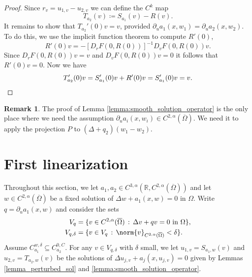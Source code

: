 \documentclass[11pt,a4paper]{amsart}
\theoremstyle{definition}
\newtheorem{Remark}[Theorem]{Remark}
\numberwithin{equation}{section}
\newcommand{\mR}{\mathbb{R}}                    %
\newcommand{\ol}[1]{\overline{#1}}
\newcommand{\p}{\partial}
\newcommand{\Om}{\Omega}
\begin{document}
\begin{proof}
Since $r_v = u_{1,v} - u_{2,v}$ we can define the $C^k$ map
\begin{equation*}
	T_{a_2}(v) \coloneqq S_{a_1}(v) - R(v).
\end{equation*}
It remains to show that $T_{a_2}'(0)v = v$, provided \( \partial_{u}a_{1}(x,w_{1}) = \partial_{u}a_{2}(x,w_{2}) \).
To do this, we use the implicit function theorem to compute $R'(0)$,
\begin{equation*}
	R'(0)v = -[D_rF(0,R(0))]^{-1}D_vF(0,R(0))v.
\end{equation*}
Since $D_rF(0,R(0))v = v$ and $D_vF(0,R(0))v = 0$ it follows that $R'(0)v = 0$.
Now we have
\begin{equation*}
	T_{a_2}'(0)v = S_{a_1}'(0)v + R'(0)v = S_{a_1}'(0)v = v. \qedhere
\end{equation*}
\end{proof}

\begin{Remark}
    The proof of Lemma \ref{lemma:smooth_solution_operator} is the only place where we need the assumption $\p_ua_i(x,w_i)\in C^{2,\alpha}(\ol{\Om})$. We need it to apply the projection $P$ to $(\Delta + q_2)(w_1-w_2)$.
\end{Remark}

\section{First linearization} \label{sec_first_linearization}

Throughout this section, we let $a_1, a_2 \in C^{3,\alpha}(\mR, C^{2,\alpha}(\ol{\Om}))$ and let $w\in C^{2,\alpha}(\ol{\Om})$ be a fixed solution of $\Delta w + a_1(x,w) = 0$ in $\Om$. Write $q = \p_u a_1(x,w)$ and consider the sets 
\begin{align*}
V_q &= \{ v \in C^{2,\alpha}(\ol{\Om}) \,:\, \Delta v + qv = 0 \text{ in $\Om$} \}, \\
V_{q,\delta} &= \{ v \in V_q \,:\, \norm{v}_{C^{2,\alpha}(\ol{\Om})} < \delta \}.
\end{align*}
Assume $C_{a_1}^{w,\delta} \subseteq C_{a_2}^{0,C}$. For any $v \in V_{q,\delta}$ with $\delta$ small, we let $u_{1,v} = S_{a_1,w}(v)$ and $u_{2,v} = T_{a_2,w}(v)$ be the solutions of $\Delta u_{j,v} + a_j(x,u_{j,v}) = 0$ given by Lemmas \ref{lemma_perturbed_sol} and \ref{lemma:smooth_solution_operator}.
\end{document}
